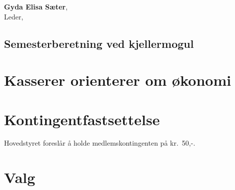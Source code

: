 \documentclass[10pt,norsk,a4paper,usenames,dvipsnames]{article}
\begin{document}
\textbf{Gyda Elisa Sæter}, \\
Leder, \date{\emph{10. november 2021}}


\subsection{Semesterberetning ved kjellermogul}



\section{Kasserer orienterer om økonomi}


\section{Kontingentfastsettelse}
    Hovedstyret foreslår å holde medlemskontingenten på kr.~50,-.


\section{Valg}
\end{document}
